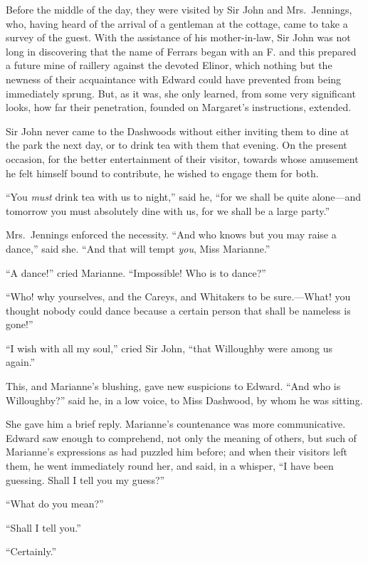 Before the middle of the day, they were visited by Sir
John and Mrs.\ Jennings, who, having heard of the arrival
of a gentleman at the cottage, came to take a survey
of the guest.  With the assistance of his mother-in-law,
Sir John was not long in discovering that the name of
Ferrars began with an F. and this prepared a future mine
of raillery against the devoted Elinor, which nothing but
the newness of their acquaintance with Edward could have
prevented from being immediately sprung.  But, as it was,
she only learned, from some very significant looks, how far
their penetration, founded on Margaret's instructions, extended.

Sir John never came to the Dashwoods without either
inviting them to dine at the park the next day, or to drink
tea with them that evening.  On the present occasion,
for the better entertainment of their visitor, towards
whose amusement he felt himself bound to contribute,
he wished to engage them for both.

``You \emph{must} drink tea with us to night,'' said he,
``for we shall be quite alone---and tomorrow you must
absolutely dine with us, for we shall be a large party.''

Mrs.\ Jennings enforced the necessity.  ``And who knows
but you may raise a dance,'' said she.  ``And that will
tempt \emph{you}, Miss Marianne.''

``A dance!'' cried Marianne.  ``Impossible! Who is to dance?''

``Who! why yourselves, and the Careys, and Whitakers
to be sure.---What! you thought nobody could dance
because a certain person that shall be nameless is gone!''

``I wish with all my soul,'' cried Sir John,
``that Willoughby were among us again.''

This, and Marianne's blushing, gave new suspicions
to Edward.  ``And who is Willoughby?'' said he, in a low voice,
to Miss Dashwood, by whom he was sitting.

She gave him a brief reply.  Marianne's countenance
was more communicative.  Edward saw enough to comprehend,
not only the meaning of others, but such of Marianne's
expressions as had puzzled him before; and when their
visitors left them, he went immediately round her, and said,
in a whisper, ``I have been guessing.  Shall I tell you
my guess?''

``What do you mean?''

``Shall I tell you.''

``Certainly.''

